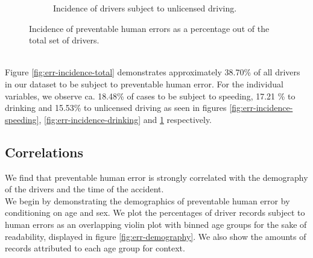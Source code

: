 \documentclass{article}
\theoremstyle{plain}
\theoremstyle{definition}
\theoremstyle{remark}
\begin{document}
\begin{figure}[ht]
\begin{subfigure}[ht]{0.49\columnwidth}
			\caption{Incidence of drivers subject to unlicensed driving.}
			\label{fig:err-incidence-license}
		\end{subfigure}
	\caption{Incidence of preventable human errors as a percentage out of the total set of drivers.}
	\label{fig:incidence}
	\vskip 0.2in
\end{figure}
\\
Figure \ref{fig:err-incidence-total} demonstrates approximately 38.70\% of all drivers in our dataset to be subject to preventable human error. For the individual variables, we observe ca. 18.48\% of cases to be subject to speeding, 17.21 \% to drinking and 15.53\% to unlicensed driving as seen in figures \ref{fig:err-incidence-speeding}, \ref{fig:err-incidence-drinking} and \ref{fig:err-incidence-license} respectively.

\subsection{Correlations}
We find that preventable human error is strongly correlated with the demography of the drivers and the time of the accident.
\\
We begin by demonstrating the demographics of preventable human error by conditioning on age and sex. We plot the percentages of driver records subject to human errors as an overlapping violin plot with binned age groups for the sake of readability, displayed in figure \ref{fig:err-demography}. We also show the amounts of records attributed to each age group for context.
\end{document}
